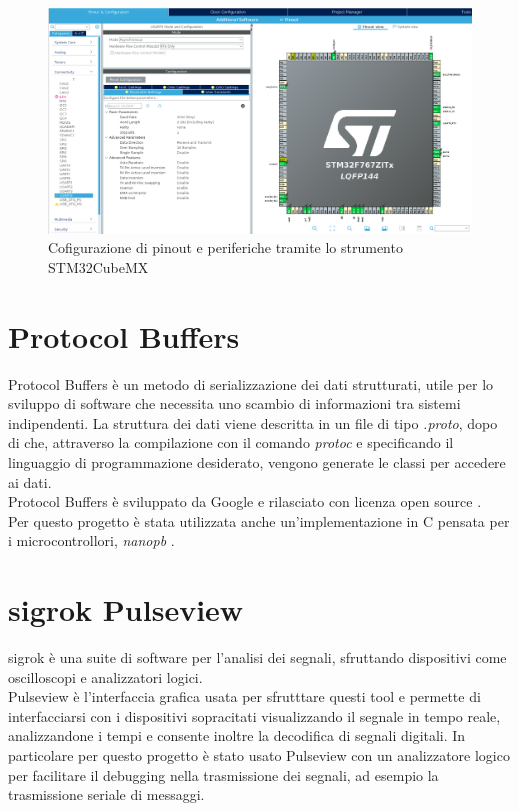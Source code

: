 \begin{figure}[H]
\centering
\includegraphics[scale=0.25]{images/stm32cubemx.png}
\caption{Cofigurazione di pinout e periferiche tramite lo strumento STM32CubeMX}
\end{figure}

\section{Protocol Buffers}
Protocol Buffers è un metodo di serializzazione dei dati strutturati, utile per lo sviluppo di software che necessita uno scambio di informazioni tra sistemi indipendenti.
La struttura dei dati viene descritta in un file di tipo \textit{.proto}, dopo di che, attraverso la compilazione con il comando \textit{protoc} e specificando il linguaggio di programmazione desiderato, vengono generate le classi per accedere ai dati. \\


                
Protocol Buffers è sviluppato da Google e rilasciato con licenza open source \cite{ProtocolBuffers}. \\
Per questo progetto è stata utilizzata anche un'implementazione in C pensata per i microcontrollori, \textit{nanopb} \cite{nanopb}.

\section{sigrok Pulseview}
sigrok è una suite di software per l'analisi dei segnali, sfruttando dispositivi come oscilloscopi e analizzatori logici. \\
Pulseview è l'interfaccia grafica usata per sfrutttare questi tool e permette di interfacciarsi con i dispositivi sopracitati visualizzando il segnale in tempo reale, analizzandone i tempi e consente inoltre la decodifica di segnali digitali.
In particolare per questo progetto è stato usato Pulseview con un analizzatore logico per facilitare il debugging nella trasmissione dei segnali, ad esempio la trasmissione seriale di messaggi.

